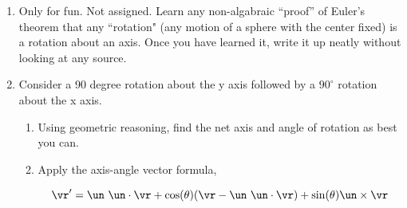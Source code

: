 \documentclass[11pt]{article}
\def\tight{ \setlength{\itemsep}{1.5pt}\setlength{\parskip}{0pt}\setlength{\parsep}{0pt}}
\begin{document}
\begin{enumerate}
\begin{enumerate}\tight
\item Send one zip file called YourName4730.zip or Yourame5730.zip. 
\begin{enumerate}\tight
\item That should be a compressed version of a single folder.
\item In that folder should be a collection of Matlab files
\item In that folder should be a  *README file explaining how to use the Matlab files.
It should be VERY EASY to use the files for simple demonstrations
\item In that folder should be a file called REPORT.pdf.  It could be made from WORD, LateX
or scanned handwork, or any mixture of those.  It should explain what you have done, how,
and give sample output. This is the main demonstration of your effort.  As appendices this should
include your documented matlab files.
\item A video presentation of your final project. Three minutes maximum. 
\end{enumerate}
\item Your assigned exam time will start with the examiner (Ruina) watching your 3 minute presentation 
movie. 
\end{enumerate}



\item Only for fun.  Not assigned. Learn any non-algabraic ``proof'' of Euler's theorem that any ``rotation" (any motion of a sphere with the center fixed) is a rotation about an axis. Once you have learned it, write it up neatly without looking at any source.





\item  Consider a 90 degree rotation about the y axis followed by a $90^\circ$ rotation about the x axis.
\begin{enumerate}[\bf  a)]
\item Using geometric reasoning, find the net axis and angle of rotation as best you can.
\item Apply the axis-angle vector formula, 

\begin{equation}
\vr' =\un\  \un\cdot \vr + \cos(\theta)(\vr - \un\  \un\cdot \vr) + \sin(\theta)\un\times\vr
\end{equation}



\end{enumerate}
\end{enumerate}
\end{document}
